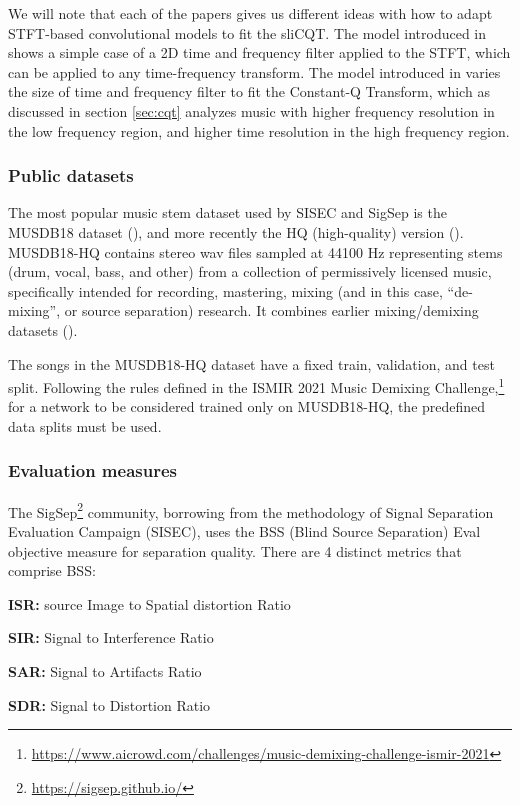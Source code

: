 \documentclass[report.tex]{subfiles}
\begin{document}
We will note that each of the papers gives us different ideas with how to adapt STFT-based convolutional models to fit the sliCQT. The model introduced in \textcite{plumbley1} shows a simple case of a 2D time and frequency filter applied to the STFT, which can be applied to any time-frequency transform. The model introduced in \textcite{plumbley2} varies the size of time and frequency filter to fit the Constant-Q Transform, which as discussed in section \ref{sec:cqt} analyzes music with higher frequency resolution in the low frequency region, and higher time resolution in the high frequency region.

\subsubsection{Public datasets}

The most popular music stem dataset used by SISEC and SigSep is the MUSDB18 dataset (\cite{musdb18}), and more recently the HQ (high-quality) version (\cite{musdb18hq}). MUSDB18-HQ contains stereo wav files sampled at 44100 Hz representing stems (drum, vocal, bass, and other) from a collection of permissively licensed music, specifically intended for recording, mastering, mixing (and in this case, ``de-mixing'', or source separation) research. It combines earlier mixing/demixing datasets (\cite{otherdataset1, otherdataset2}).

The songs in the MUSDB18-HQ dataset have a fixed train, validation, and test split. Following the rules defined in the ISMIR 2021 Music Demixing Challenge,\footnote{\url{https://www.aicrowd.com/challenges/music-demixing-challenge-ismir-2021}} for a network to be considered trained only on MUSDB18-HQ, the predefined data splits must be used.

\subsubsection{Evaluation measures}
\label{sec:evalbss}

The SigSep\footnote{\url{https://sigsep.github.io/}} community, borrowing from the methodology of Signal Separation Evaluation Campaign (SISEC), uses the BSS (Blind Source Separation) Eval \cite{bss} objective measure for separation quality. There are 4 distinct metrics that comprise BSS:

\begin{tight_itemize}
\item
	\textbf{ISR:} source Image to Spatial distortion Ratio
\item
	\textbf{SIR:} Signal to Interference Ratio
\item
	\textbf{SAR:} Signal to Artifacts Ratio
\item
	\textbf{SDR:} Signal to Distortion Ratio
\end{tight_itemize}
\end{document}
